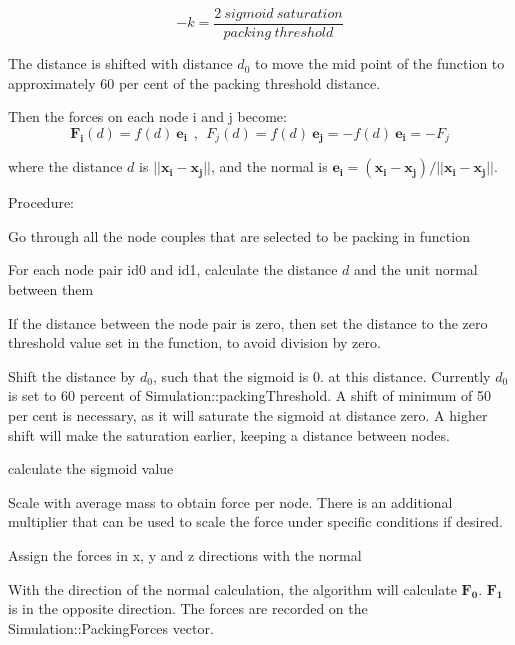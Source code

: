 \[ -k = \frac{2\:sigmoid\:saturation}{packing\:threshold} \]

The distance is shifted with distance $ d_{0} $ to move the mid point of the function to approximately 60 per cent of the packing threshold distance.



Then the forces on each node i and j become\+: \[ \mathbf{F_{i}}\left( d \right) = f\left( d \right)\: \mathbf{e_{i}}\:\:,\:\: F_{j}\left( d \right) = f\left( d \right)\: \mathbf{e_{j}}=-f\left( d \right)\: \mathbf{e_{i}}=-F_{j} \]

where the distance $ d $ is $ ||\mathbf{x_{i}}-\mathbf{x_{j}} || $, and the normal is $ \mathbf{e_{i}} = \left( \mathbf{x_{i}}-\mathbf{x_{j}} \right) / ||\mathbf{x_{i}}-\mathbf{x_{j}} || $.

Procedure\+:


\begin{DoxyItemize}
\item Go through all the node couples that are selected to be packing in function
\item For each node pair id0 and id1, calculate the distance $ d $ and the unit normal between them
\item If the distance between the node pair is zero, then set the distance to the zero threshold value set in the function, to avoid division by zero.
\item Shift the distance by $ d_{0} $, such that the sigmoid is 0. at this distance. Currently $ d_{0} $ is set to 60 percent of Simulation\+::packing\+Threshold. A shift of minimum of 50 per cent is necessary, as it will saturate the sigmoid at distance zero. A higher shift will make the saturation earlier, keeping a distance between nodes.
\item calculate the sigmoid value
\item Scale with average mass to obtain force per node. There is an additional multiplier that can be used to scale the force under specific conditions if desired.
\item Assign the forces in x, y and z directions with the normal
\item With the direction of the normal calculation, the algorithm will calculate $ \mathbf{F_{0}} $. $ \mathbf{F_{1}} $ is in the opposite direction. The forces are recorded on the Simulation\+::\+Packing\+Forces vector.
\end{DoxyItemize}\hypertarget{classSimulation_a07d76a2495e1b863ab0cdb7185821bec}{}
